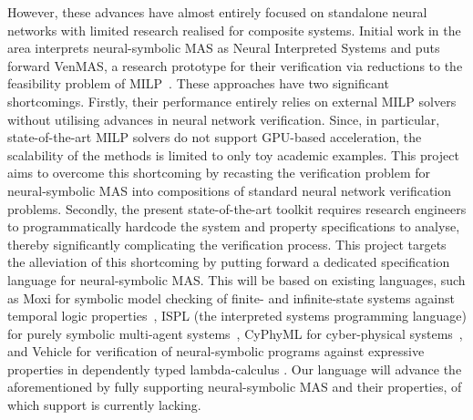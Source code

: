 \documentclass[11pt]{article}
\begin{document}
However, these advances have almost entirely focused on
standalone neural networks with limited research realised
for composite systems.  Initial work in the area interprets
neural-symbolic MAS as Neural Interpreted Systems and puts
forward {\sc VenMAS}, a research prototype for their
verification via reductions to the feasibility problem of
MILP~\cite{Akintunde+18,Akintunde+20,Akintunde+22,KouvarosBB24}.
These approaches have two significant shortcomings. Firstly,
their performance entirely relies on external MILP solvers
without utilising advances in neural network verification.
Since, in particular, state-of-the-art MILP solvers do
not support GPU-based acceleration, the scalability of the
methods is limited to only toy academic examples. This
project aims to overcome this shortcoming by recasting the
verification problem for neural-symbolic MAS into
compositions of standard neural network verification
problems. Secondly, the present state-of-the-art toolkit
requires  research engineers  to programmatically
hardcode the system and property specifications to analyse,
thereby significantly complicating the verification process.
This project targets the alleviation of this shortcoming by
putting forward a dedicated specification language for
neural-symbolic MAS.  This will be based on existing
languages, such as Moxi for symbolic model checking of
finite- and infinite-state systems against temporal logic
properties~\cite{Rozier+2024}, ISPL (the interpreted systems
programming language) for purely symbolic multi-agent
systems~\cite{LomuscioQR17}, CyPhyML for cyber-physical
systems~\cite{Simko+13}, and Vehicle for verification of
neural-symbolic programs against expressive properties in
dependently typed lambda-calculus \cite{Daggitt+24}. Our
language will advance the aforementioned by fully supporting
neural-symbolic MAS and their properties, of which  support is
currently lacking.


\end{document}
